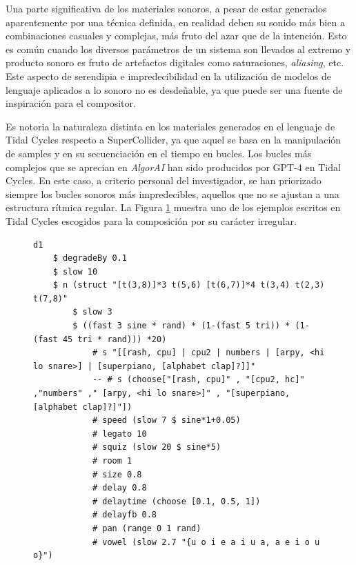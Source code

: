 Una parte significativa de los materiales sonoros, a pesar de estar generados aparentemente por una técnica definida, en realidad deben su sonido más bien a combinaciones casuales y complejas, más fruto del azar que de la intención. Esto es común cuando los diversos parámetros de un sistema son llevados al extremo y producto sonoro es fruto de artefactos digitales como saturaciones, \emph{aliasing}, etc. Este aspecto de serendipia e impredecibilidad en la utilización de modelos de lenguaje aplicados a lo sonoro no es desdeñable, ya que puede ser una fuente de inspiración para el compositor.

Es notoria la naturaleza distinta en los materiales generados en el lenguaje de Tidal Cycles respecto a SuperCollider, ya que aquel se basa en la manipulación de samples y en su secuenciación en el tiempo en bucles. Los bucles más complejos que se aprecian en \emph{AlgorAI} han sido producidos por GPT-4 en Tidal Cycles. En este caso, a criterio personal del investigador, se han priorizado siempre los bucles sonoros más impredecibles, aquellos que no se ajustan a una estructura rítmica regular. La Figura \ref{fig:ejemplo_tidal_irregular} muestra uno de los ejemplos escritos en Tidal Cycles escogidos para la composición por su carácter irregular.



\begin{figure}[H]
    \centering
    \begin{lstlisting}[style=SuperCollider-IDE, language=ExtendedHaskell, basicstyle=\footnotesize\ttfamily, numbers=none]
d1 
    $ degradeBy 0.1
    $ slow 10 
    $ n (struct "[t(3,8)]*3 t(5,6) [t(6,7)]*4 t(3,4) t(2,3) t(7,8)"
        $ slow 3 
        $ ((fast 3 sine * rand) * (1-(fast 5 tri)) * (1-(fast 45 tri * rand))) *20) 
            # s "[[rash, cpu] | cpu2 | numbers | [arpy, <hi lo snare>] | [superpiano, [alphabet clap]?]]" 
            -- # s (choose["[rash, cpu]" , "[cpu2, hc]" ,"numbers" ," [arpy, <hi lo snare>]" , "[superpiano, [alphabet clap]?]"])
            # speed (slow 7 $ sine*1+0.05) 
            # legato 10
            # squiz (slow 20 $ sine*5)
            # room 1
            # size 0.8
            # delay 0.8
            # delaytime (choose [0.1, 0.5, 1])
            # delayfb 0.8
            # pan (range 0 1 rand)
            # vowel (slow 2.7 "{u o i e a i u a, a e i o u o}")
    \end{lstlisting}
    \source{\propio}
    \label{fig:ejemplo_tidal_irregular}
\end{figure}

